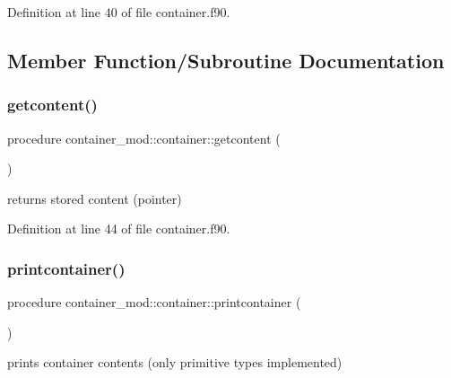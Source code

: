 Definition at line 40 of file container.\+f90.



\subsection{Member Function/\+Subroutine Documentation}
\mbox{\label{structcontainer__mod_1_1container_abe1540dea98e715a935b91c662a2d81a}} 
\subsubsection{\texorpdfstring{getcontent()}{getcontent()}}
{\footnotesize\ttfamily procedure container\+\_\+mod\+::container\+::getcontent (\begin{DoxyParamCaption}{ }\end{DoxyParamCaption})\hspace{0.3cm}{\ttfamily [private]}}



returns stored content (pointer) 



Definition at line 44 of file container.\+f90.

\mbox{\label{structcontainer__mod_1_1container_ac62ed00e4c79b7c758a5efbc9cc1909a}} 
\subsubsection{\texorpdfstring{printcontainer()}{printcontainer()}}
{\footnotesize\ttfamily procedure container\+\_\+mod\+::container\+::printcontainer (\begin{DoxyParamCaption}{ }\end{DoxyParamCaption})\hspace{0.3cm}{\ttfamily [private]}}



prints container contents (only primitive types implemented) 



